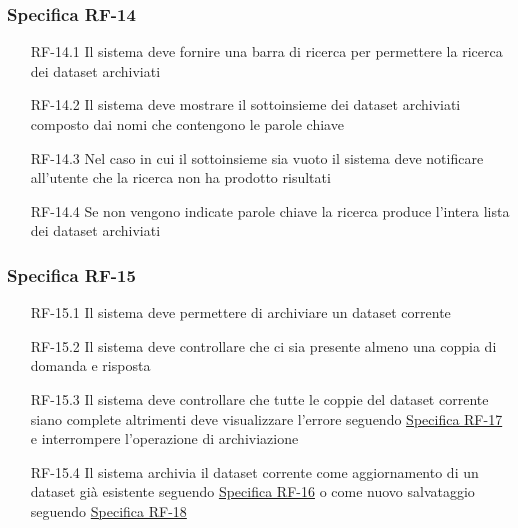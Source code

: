 \subsubsection{Specifica RF-14}
\label{subsubsec:RF-14}
\begin{enumerate}
    \item[RF-14.1] Il sistema deve fornire una barra di ricerca per permettere la ricerca dei dataset archiviati
    \item[RF-14.2] Il sistema deve mostrare il sottoinsieme dei dataset archiviati composto dai nomi che contengono le parole chiave
    \item[RF-14.3] Nel caso in cui il sottoinsieme sia vuoto il sistema deve notificare all'utente che la ricerca non ha prodotto risultati
    \item[RF-14.4] Se non vengono indicate parole chiave la ricerca produce l'intera lista dei dataset archiviati
\end{enumerate}


\subsubsection{Specifica RF-15}
\label{subsubsec:RF-15}
\begin{enumerate}
    \item[RF-15.1] Il sistema deve permettere di archiviare un dataset corrente
    \item[RF-15.2] Il sistema deve controllare che ci sia presente almeno una coppia di domanda e risposta
    \item[RF-15.3] Il sistema deve controllare che tutte le coppie del dataset corrente siano complete altrimenti deve visualizzare l'errore seguendo \hyperref[subsubsec:RF-17]{Specifica RF-17} e interrompere l'operazione di archiviazione
    \item[RF-15.4] Il sistema archivia il dataset corrente come aggiornamento di un dataset già esistente seguendo \hyperref[subsubsec:RF-16]{Specifica RF-16}
    o come nuovo salvataggio seguendo \hyperref[subsubsec:RF-18]{Specifica RF-18}
\end{enumerate}

